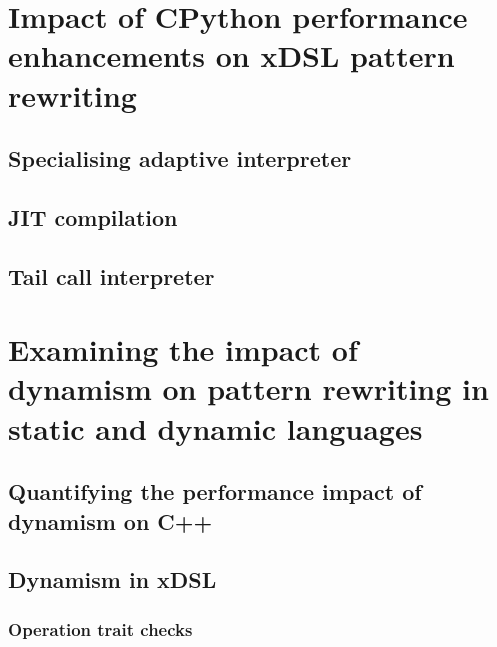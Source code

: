 \chapter{Impact of CPython performance enhancements on xDSL pattern rewriting}

\section{Specialising adaptive interpreter}
\section{JIT compilation}
\section{Tail call interpreter}









\chapter{Examining the impact of dynamism on pattern rewriting in static and dynamic languages}

\section{Quantifying the performance impact of dynamism on C++}

\section{Dynamism in xDSL}

\subsection{Operation trait checks}

